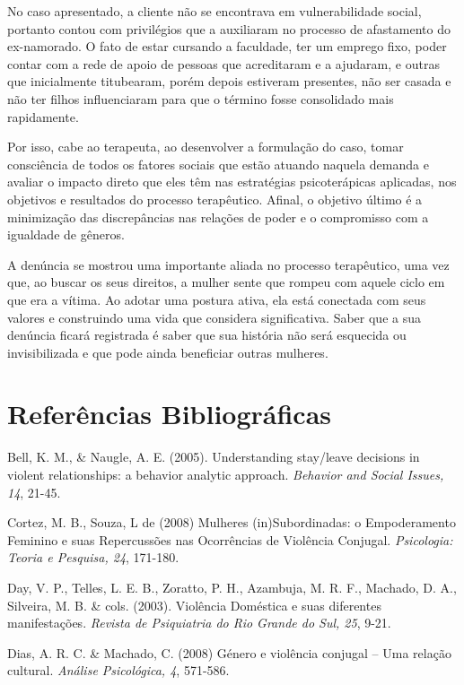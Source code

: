 No caso apresentado, a cliente não se encontrava em vulnerabilidade social, portanto contou com privilégios que a auxiliaram no processo de afastamento do ex-namorado. O fato de estar cursando a faculdade, ter um emprego fixo, poder contar com a rede de apoio de pessoas que acreditaram e a ajudaram, e outras que inicialmente titubearam, porém depois estiveram presentes, não ser casada e não ter filhos influenciaram para que o término fosse consolidado mais rapidamente.

Por isso, cabe ao terapeuta, ao desenvolver a formulação do caso, tomar consciência de todos os fatores sociais que estão atuando naquela demanda e avaliar o impacto direto que eles têm nas estratégias psicoterápicas aplicadas, nos objetivos e resultados do processo terapêutico. Afinal, o objetivo último é a minimização das discrepâncias nas relações de poder e o compromisso com a igualdade de gêneros.

A denúncia se mostrou uma importante aliada no processo terapêutico, uma vez que, ao buscar os seus direitos, a mulher sente que rompeu com aquele ciclo em que era a vítima. Ao adotar uma postura ativa, ela está conectada com seus valores e construindo uma vida que considera significativa. Saber que a sua denúncia ficará registrada é saber que sua história não será esquecida ou invisibilizada e que pode ainda beneficiar outras mulheres.
\vfill
\newpage

\section*{Referências Bibliográficas}

\hangindent=25pt
\noindent Bell, K. M., \& Naugle, A. E. (2005). Understanding stay/leave decisions in violent relationships: a behavior analytic approach. \textit{Behavior and Social Issues, 14}, 21-45.

\hangindent=25pt
\noindent Cortez, M. B., Souza, L de (2008) Mulheres (in)Subordinadas: o Empoderamento Feminino e suas Repercussões nas Ocorrências de Violência Conjugal. \textit{Psicologia: Teoria e Pesquisa, 24}, 171-180.

\hangindent=25pt
\noindent Day, V. P., Telles, L. E. B., Zoratto, P. H., Azambuja, M. R. F., Machado, D. A., Silveira, M. B. \& cols. (2003). Violência Doméstica e suas diferentes manifestações. \textit{Revista de Psiquiatria do Rio Grande do Sul, 25}, 9-21.

\hangindent=25pt
\noindent Dias, A. R. C. \& Machado, C. (2008) Género e violência conjugal – Uma relação cultural. \textit{Análise Psicológica, 4}, 571-586.

